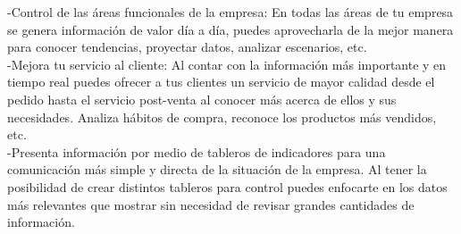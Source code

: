 -Control de las áreas funcionales de la empresa: En todas las áreas de tu empresa se genera información de valor día a día, puedes aprovecharla de la mejor manera para conocer tendencias, proyectar datos, analizar escenarios, etc.\\

-Mejora tu servicio al cliente: Al contar con la información más importante y en tiempo real puedes ofrecer a tus clientes un servicio de mayor calidad desde el pedido hasta el servicio post-venta al conocer más acerca de ellos y sus necesidades. Analiza hábitos de compra, reconoce los productos más vendidos, etc.\\

-Presenta información por medio de tableros de indicadores para una comunicación más simple y directa de la situación de la empresa. Al tener la posibilidad de crear distintos tableros para control puedes enfocarte en los datos más relevantes que mostrar sin necesidad de revisar grandes cantidades de información.\\


